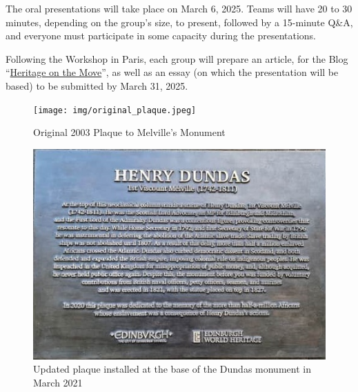 \documentclass{scrartcl}
\begin{document}
\begin{appendices}
 The oral presentations will take place on March 6, 2025. Teams will have 20 to 30 minutes, depending on the group’s size, to present, followed by a 15-minute Q\&A, and everyone must participate in some capacity during the presentations.

Following the Workshop in Paris, each group will prepare an article, for the Blog “\href{https://herblog.hypotheses.org/}{Heritage on the Move}”, as well as an essay (on which the presentation will be based) to be submitted by March 31, 2025.


\begin{figure}
    \centering
    \texttt{[image: img/original\_plaque.jpeg]}
    \caption{Original 2003 Plaque to Melville's Monument}
    \label{fig:original_plaque}
\end{figure}

\begin{figure}
    \centering
    \includegraphics[width=1\linewidth]{img/updated-plaque.jpg}
    \caption{Updated plaque installed at the base of the Dundas monument in March 2021}
    \label{fig:updated_plaque}
\end{figure}


\end{appendices}
\end{document}

